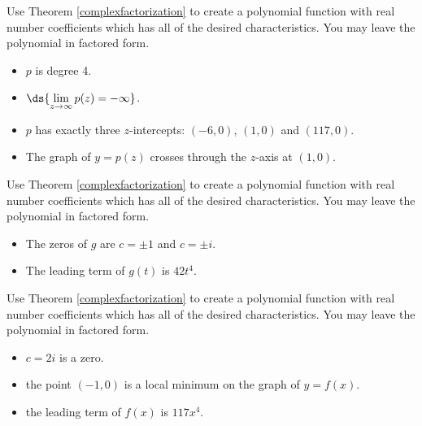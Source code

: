\documentclass{ximera}
\begin{document}
\begin{problem}
Use Theorem \ref{complexfactorization} to create a polynomial function with real number coefficients which has all of the desired characteristics.  You may leave the polynomial in factored form.

\begin{itemize}

\item $p$ is degree 4.
\item $\ds{\lim_{z \rightarrow \infty} p(z) =  -\infty}$.
\item $p$ has exactly three $z$-intercepts:  $(-6,0)$, $(1,0)$ and $(117,0)$.
\item  The graph of $y=p(z)$ crosses through the $z$-axis at $(1,0)$.

\end{itemize}
\end{problem}

\begin{problem}
Use Theorem \ref{complexfactorization} to create a polynomial function with real number coefficients which has all of the desired characteristics.  You may leave the polynomial in factored form.

\begin{itemize}

\item The zeros of $g$ are $c=\pm 1$ and $c = \pm i$.
\item The leading term of $g(t)$ is $42t^4$.

\end{itemize}
\end{problem}

\begin{problem}
Use Theorem \ref{complexfactorization} to create a polynomial function with real number coefficients which has all of the desired characteristics.  You may leave the polynomial in factored form.

\begin{itemize}

\item $c=2i$ is a zero.
\item the point $(-1,0)$ is a local minimum on the graph of $y=f(x)$.
\item the leading term of $f(x)$ is $117x^4$.

\end{itemize}
\end{problem}
\end{document}
